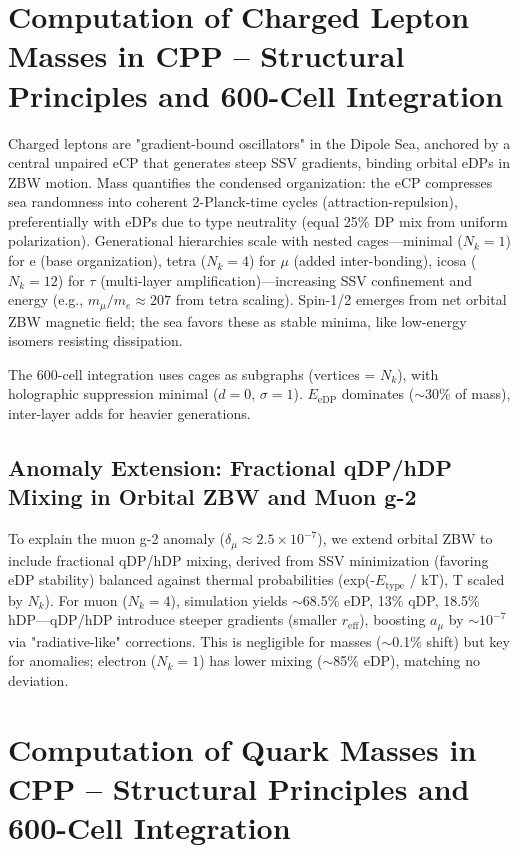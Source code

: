 \documentclass{article}
\begin{document}
\section{Computation of Charged Lepton Masses in CPP -- Structural Principles and 600-Cell Integration}

Charged leptons are "gradient-bound oscillators" in the Dipole Sea, anchored by a central unpaired eCP that generates steep SSV gradients, binding orbital eDPs in ZBW motion. Mass quantifies the condensed organization: the eCP compresses sea randomness into coherent 2-Planck-time cycles (attraction-repulsion), preferentially with eDPs due to type neutrality (equal 25\% DP mix from uniform polarization). Generational hierarchies scale with nested cages—minimal ($N_k=1$) for e (base organization), tetra ($N_k=4$) for $\mu$ (added inter-bonding), icosa ($N_k=12$) for $\tau$ (multi-layer amplification)—increasing SSV confinement and energy (e.g., $m_\mu / m_e \approx 207$ from tetra scaling). Spin-1/2 emerges from net orbital ZBW magnetic field; the sea favors these as stable minima, like low-energy isomers resisting dissipation.

The 600-cell integration uses cages as subgraphs (vertices = $N_k$), with holographic suppression minimal ($d=0$, $\sigma=1$). $E_{\text{eDP}}$ dominates ($\sim$30\% of mass), inter-layer adds for heavier generations.

\subsection{Anomaly Extension: Fractional qDP/hDP Mixing in Orbital ZBW and Muon g-2}

To explain the muon g-2 anomaly ($\delta_\mu \approx 2.5 \times 10^{-7}$), we extend orbital ZBW to include fractional qDP/hDP mixing, derived from SSV minimization (favoring eDP stability) balanced against thermal probabilities (exp(-$E_{\text{type}}$ / kT), T scaled by $N_k$). For muon ($N_k=4$), simulation yields $\sim$68.5\% eDP, 13\% qDP, 18.5\% hDP—qDP/hDP introduce steeper gradients (smaller $r_{\text{eff}}$), boosting $a_\mu$ by $\sim 10^{-7}$ via "radiative-like" corrections. This is negligible for masses ($\sim$0.1\% shift) but key for anomalies; electron ($N_k=1$) has lower mixing ($\sim$85\% eDP), matching no deviation.

\section{Computation of Quark Masses in CPP -- Structural Principles and 600-Cell Integration}
\end{document}
